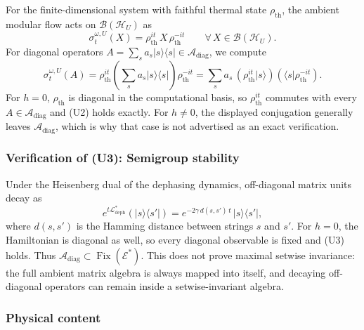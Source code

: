 \documentclass[12pt,a4paper]{article}
\begin{document}
For the finite-dimensional system with faithful thermal state $\rho_{\mathrm{th}}$, the ambient modular flow acts on $\mathcal{B}(\mathcal{H}_U)$ as
\begin{equation}
\sigma_t^{\omega,U}(X) = \rho_{\mathrm{th}}^{it}\, X\, \rho_{\mathrm{th}}^{-it} \qquad \forall\, X \in \mathcal{B}(\mathcal{H}_U).
\end{equation}
For diagonal operators $A = \sum_s a_s |s\rangle\langle s| \in \mathcal{A}_{\mathrm{diag}}$, we compute
\begin{equation}
\sigma_t^{\omega,U}(A) = \rho_{\mathrm{th}}^{it} \left(\sum_s a_s |s\rangle\langle s|\right) \rho_{\mathrm{th}}^{-it} = \sum_s a_s\, (\rho_{\mathrm{th}}^{it}|s\rangle)(\langle s|\rho_{\mathrm{th}}^{-it}).
\end{equation}
For $h=0$, $\rho_{\mathrm{th}}$ is diagonal in the computational basis, so $\rho_{\mathrm{th}}^{it}$ commutes with every $A\in\mathcal A_{\mathrm{diag}}$ and (U2) holds exactly.  For $h\ne0$, the displayed conjugation generally leaves $\mathcal A_{\mathrm{diag}}$, which is why that case is not advertised as an exact verification.

\subsubsection{Verification of (U3): Semigroup stability}

Under the Heisenberg dual of the dephasing dynamics, off-diagonal matrix units decay as
\begin{equation}
e^{t\mathcal{L}_{\mathrm{deph}}^*}(|s\rangle\langle s'|) = e^{-2\gamma\, d(s,s')\, t}\, |s\rangle\langle s'|,
\end{equation}
where $d(s, s')$ is the Hamming distance between strings $s$ and $s'$.
For $h=0$, the Hamiltonian is diagonal as well, so every diagonal observable is fixed and (U3) holds.  Thus $\mathcal A_{\mathrm{diag}}\subset\operatorname{Fix}(\mathcal E^*)$.  This does not prove maximal setwise invariance: the full ambient matrix algebra is always mapped into itself, and decaying off-diagonal operators can remain inside a setwise-invariant algebra.

\subsubsection{Physical content}
\end{document}
